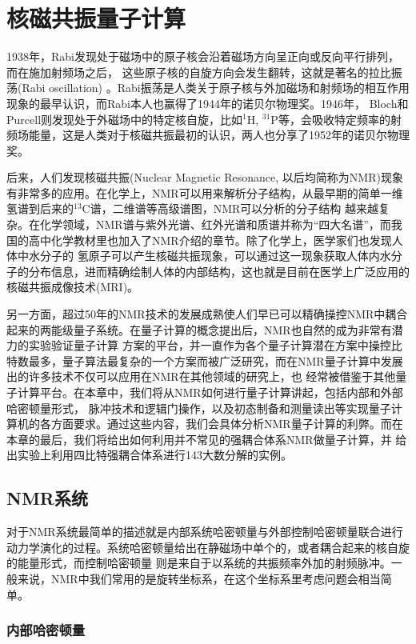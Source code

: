 ﻿
\chapter{核磁共振量子计算}

1938年，Rabi发现处于磁场中的原子核会沿着磁场方向呈正向或反向平行排列，而在施加射频场之后，
这些原子核的自旋方向会发生翻转，这就是著名的拉比振荡(Rabi oscillation) \cite{rabi}。Rabi振荡是人类关于原子核与外加磁场和射频场的相互作用现象的最早认识，而Rabi本人也赢得了1944年的诺贝尔物理奖。1946年，
Bloch和Purcell则发现处于外磁场中的特定核自旋，比如$^1$H, $^{31}$P等，会吸收特定频率的射频场能量，这是人类对于核磁共振最初的认识\cite{nmrhistory}，两人也分享了1952年的诺贝尔物理奖。

后来，人们发现核磁共振(Nuclear Magnetic Resonance, 以后均简称为NMR)现象有非常多的应用。在化学上，NMR可以用来解析分子结构，从最早期的简单一维氢谱到后来的$^{13}$C谱，二维谱等高级谱图，NMR可以分析的分子结构
越来越复杂。在化学领域，NMR谱与紫外光谱、红外光谱和质谱并称为“四大名谱”，而我国的高中化学教材里也加入了NMR介绍的章节。除了化学上，医学家们也发现人体中水分子的
氢原子可以产生核磁共振现象，可以通过这一现象获取人体内水分子的分布信息，进而精确绘制人体的内部结构，这也就是目前在医学上广泛应用的核磁共振成像技术(MRI)。

另一方面，超过50年的NMR技术的发展成熟使人们早已可以精确操控NMR中耦合起来的两能级量子系统。在量子计算的概念提出后，NMR也自然的成为非常有潜力的实验验证量子计算
方案的平台，并一直作为各个量子计算潜在方案中操控比特数最多，量子算法最复杂的一个方案而被广泛研究，而在NMR量子计算中发展出的许多技术不仅可以应用在NMR在其他领域的研究上，也
经常被借鉴于其他量子计算平台。在本章中，我们将从NMR如何进行量子计算讲起，包括内部和外部哈密顿量形式，
脉冲技术和逻辑门操作，以及初态制备和测量读出等实现量子计算机的各方面要求。通过这些内容，我们会具体分析NMR量子计算的利弊。而在本章的最后，我们将给出如何利用并不常见的强耦合体系NMR做量子计算，并
给出实验上利用四比特强耦合体系进行143大数分解的实例。

\section{NMR系统}

对于NMR系统最简单的描述就是内部系统哈密顿量与外部控制哈密顿量联合进行动力学演化的过程。系统哈密顿量给出在静磁场中单个的，或者耦合起来的核自旋的能量形式，而控制哈密顿量
则是来自于以系统的共振频率外加的射频脉冲。一般来说，NMR中我们常用的是旋转坐标系，在这个坐标系里考虑问题会相当简单。

\subsection{内部哈密顿量}

